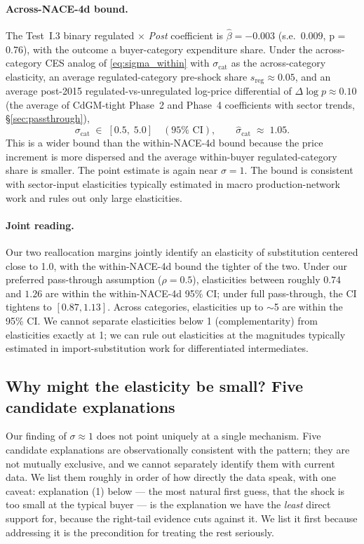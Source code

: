 \paragraph{Across-NACE-4d bound.} The Test~I.3 binary regulated $\times$ \textit{Post} coefficient is $\widehat{\beta} = -0.003$ (s.e.\ $0.009$, p = 0.76), with the outcome a buyer-category expenditure share. Under the across-category CES analog of \eqref{eq:sigma_within} with $\sigma_{\text{cat}}$ as the across-category elasticity, an average regulated-category pre-shock share $s_{\text{reg}} \approx 0.05$, and an average post-2015 regulated-vs-unregulated log-price differential of $\Delta \log p \approx 0.10$ (the average of CdGM-tight Phase~2 and Phase~4 coefficients with sector trends, \S\ref{sec:passthrough}),
\[
    \sigma_{\text{cat}} \;\in\; [0.5,\; 5.0]\quad(95\%\text{ CI}),\qquad
    \widehat{\sigma}_{\text{cat}}\;\approx\;1.05.
\]
This is a wider bound than the within-NACE-4d bound because the price increment is more dispersed and the average within-buyer regulated-category share is smaller. The point estimate is again near $\sigma = 1$. The bound is consistent with sector-input elasticities typically estimated in macro production-network work \citep[e.g.,][]{baqaee2019} and rules out only large elasticities.

\paragraph{Joint reading.} Our two reallocation margins jointly identify an elasticity of substitution centered close to 1.0, with the within-NACE-4d bound the tighter of the two. Under our preferred pass-through assumption ($\rho = 0.5$), elasticities between roughly $0.74$ and $1.26$ are within the within-NACE-4d 95\% CI; under full pass-through, the CI tightens to $[0.87, 1.13]$. Across categories, elasticities up to $\sim$5 are within the 95\% CI. We cannot separate elasticities below 1 (\ie complementarity) from elasticities exactly at 1; we can rule out elasticities at the magnitudes typically estimated in import-substitution work for differentiated intermediates.

\subsection{Why might the elasticity be small? Five candidate explanations}

Our finding of $\sigma \approx 1$ does not point uniquely at a single mechanism. Five candidate explanations are observationally consistent with the pattern; they are not mutually exclusive, and we cannot separately identify them with current data. We list them roughly in order of how directly the data speak, with one caveat: explanation (1) below --- the most natural first guess, that the shock is too small at the typical buyer --- is the explanation we have the \emph{least} direct support for, because the right-tail evidence cuts against it. We list it first because addressing it is the precondition for treating the rest seriously.

